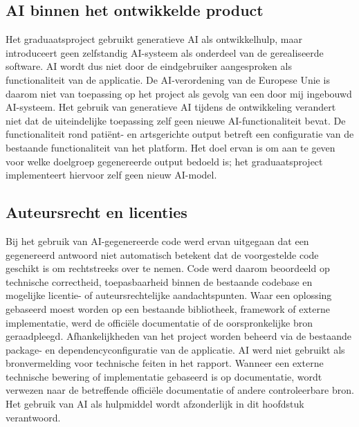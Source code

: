 \subsection*{AI binnen het ontwikkelde product}
Het graduaatsproject gebruikt generatieve AI als ontwikkelhulp, maar introduceert geen zelfstandig AI-systeem als onderdeel van de gerealiseerde software. AI wordt dus niet door de eindgebruiker aangesproken als functionaliteit van de applicatie.
De AI-verordening van de Europese Unie is daarom niet van toepassing op het project als gevolg van een door mij ingebouwd AI-systeem. Het gebruik van generatieve AI tijdens de ontwikkeling verandert niet dat de uiteindelijke toepassing zelf geen nieuwe AI-functionaliteit bevat.
De functionaliteit rond patiënt- en artsgerichte output betreft een configuratie van de bestaande functionaliteit van het platform. Het doel ervan is om aan te geven voor welke doelgroep gegenereerde output bedoeld is; het graduaatsproject implementeert hiervoor zelf geen nieuw AI-model.

\subsection*{Auteursrecht en licenties}
Bij het gebruik van AI-gegenereerde code werd ervan uitgegaan dat een gegenereerd antwoord niet automatisch betekent dat de voorgestelde code geschikt is om rechtstreeks over te nemen. Code werd daarom beoordeeld op technische correctheid, toepasbaarheid binnen de bestaande codebase en mogelijke licentie- of auteursrechtelijke aandachtspunten.
Waar een oplossing gebaseerd moest worden op een bestaande bibliotheek, framework of externe implementatie, werd de officiële documentatie of de oorspronkelijke bron geraadpleegd. Afhankelijkheden van het project worden beheerd via de bestaande package- en dependencyconfiguratie van de applicatie.
AI werd niet gebruikt als bronvermelding voor technische feiten in het rapport. Wanneer een externe technische bewering of implementatie gebaseerd is op documentatie, wordt verwezen naar de betreffende officiële documentatie of andere controleerbare bron. Het gebruik van AI als hulpmiddel wordt afzonderlijk in dit hoofdstuk verantwoord.
